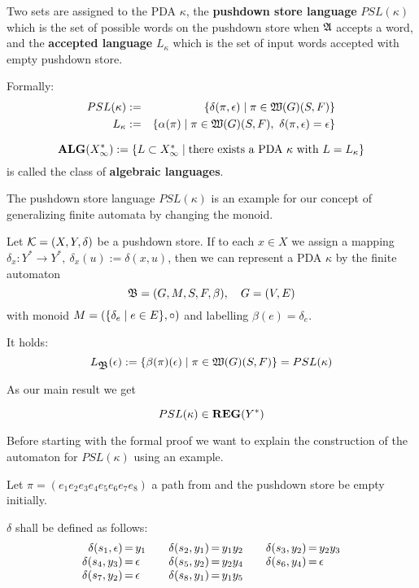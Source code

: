 Two sets are assigned to the PDA $\kappa$, the {\bf pushdown store language}
$PSL(\kappa)$ which is the set of possible words on the pushdown store when
$\mbox{$\mathfrak{A}$}$ accepts a word, and the {\bf accepted language} $L_\kappa$ which is the set of
 input words accepted with empty pushdown store.

Formally:
\begin{eqnarray*}
PSL(\kappa) &:=& \mbox{$\{\delta(\pi, \epsilon) \mid \pi \in \mbox{$\mathfrak{W}({G})$}(S, F)\}$}\\
L_\kappa &:=& \mbox{$\{\alpha(\pi) \mid \pi \in \mbox{$\mathfrak{W}({G})$}(S, F),\ \delta(\pi,
\epsilon) = \epsilon\}$}
\end{eqnarray*}


\begin{definition}
\[ \mbox{{\bf ALG}}(X_\infty^*) := \mbox{$\{L \subset X_\infty^* \mid \text{there exists a PDA
$\kappa$ with $L = L_\kappa$}\}$}
\]
is called the class of {\bf algebraic languages}.
\end{definition}

The pushdown store language $PSL(\kappa)$ is an example for our concept of
generalizing finite automata by changing the monoid. 

Let $\mbox{$\mathcal{K}$}=(X, Y, \delta)$ be a pushdown store. If to each $x\in X$ we
assign a mapping $\delta_x: Y^* \to Y^*,\ \delta_x(u) := \delta(x, u)$, then we can 
represent a PDA $\kappa$ by the finite automaton
\[ \mbox{$\mathfrak{B}$} = (G, M, S, F, \beta),\quad G=(V,E) \]
with monoid $M = (\mbox{$\{\delta_e \mid e\in E\}$}, \circ)$ and labelling $\beta(e)
= \delta_e$.

It holds:
\[ L_{\mbox{$\mathfrak{B}$}}(\epsilon) := \mbox{$\{\beta(\pi)(\epsilon) \mid \pi
\in \mbox{$\mathfrak{W}({G})$}(S, F)\}$} = PSL(\kappa)
\]

\bigskip
As our main result we get
\begin{theorem}
\[ PSL(\kappa) \in \mbox{{\bf REG}}(Y^*) \]
\end{theorem}

Before starting with the formal proof we want to explain the construction of the
automaton for $PSL(\kappa)$ using an example.

Let $\pi = (e_1 e_2 e_3 e_4 e_5 e_6 e_7 e_8)$ a path from  and the
pushdown store be empty initially.

$\delta$ shall be defined as follows:
\[\begin{array}{r@{\,=\,}l@{\qquad}r@{\,=\,}l@{\qquad}r@{\,=\,}l}
\delta(s_1,\epsilon)&y_1 & \delta(s_2,y_1)&y_1y_2 & \delta(s_3,y_2)&y_2y_3 \\
\delta(s_4,y_3)&\epsilon & \delta(s_5,y_2)&y_2y_4 & \delta(s_6,y_4)&\epsilon \\
\delta(s_7,y_2)&\epsilon & \delta(s_8,y_1)&y_1y_5
\end{array}\]

